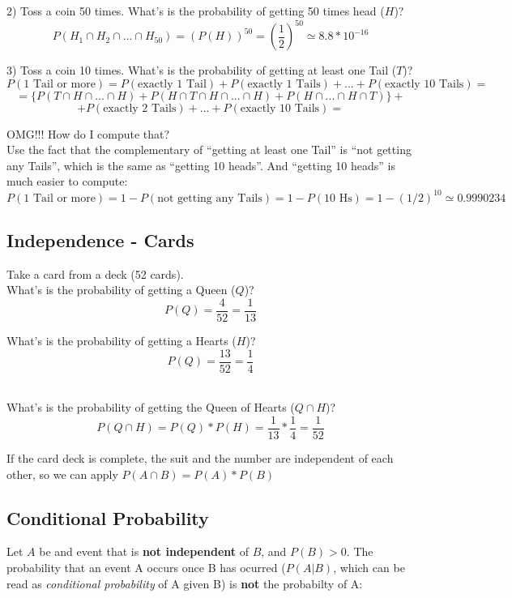 \documentclass[11pt]{article}
\begin{document}
	2) Toss a coin 50 times. What's is the probability of getting 50 times head ($H$)?
	\[P(H_1\cap H_2 \cap...\cap H_{50}) = (P(H))^{50} = \left(\frac{1}{2}\right)^{50} \simeq 8.8 * 10^{-16}\]
	
	3) Toss a coin 10 times. What's is the probability of  getting at least one Tail ($T$)?
	\[P(\text{1 Tail or more}) = P(\text{exactly 1 Tail}) + P(\text{exactly 1 Tails}) + ... + P(\text{exactly 10 Tails}) =\]
	\[= \{P(T\cap H \cap ... \cap H) + P(H \cap T\cap H \cap ... \cap H) + P(H \cap ... \cap H \cap T)\} +  \]
	\[+P(\text{exactly 2 Tails}) + ... + P(\text{exactly 10 Tails}) =\]

	OMG!!! How do I compute that?\\

	Use the fact that the complementary of ``getting at least one Tail'' is ``not getting any Tails'', which is the same as ``getting 10 heads''. And ``getting 10 heads'' is much easier to compute:
	\[P(\text{1 Tail or more}) = 1 - P(\text{not getting any Tails}) = 1 - P(\text{10 Hs}) = 1 - (1/2)^{10}  \simeq 0.9990234\]


	\subsection*{Independence - Cards}
	
	Take a card from a deck (52 cards).\\
	
	What's is the probability of getting a Queen ($Q$)?
	\[P(Q) = \frac{4}{52} = \frac{1}{13}\]
	
	What's is the probability of getting a Hearts ($H$)?
	\[P(Q) = \frac{13}{52} = \frac{1}{4}\]\
	
	
	What's is the probability of getting the Queen of Hearts ($Q \cap H$)?
	\[P(Q \cap H) = P(Q) * P(H) = \frac{1}{13} * \frac{1}{4} = \frac{1}{52}\]

	If the card deck is complete, the suit and the number are independent of each other, so we can apply $P(A \cap B) = P(A) * P(B)$

	\subsection*{Conditional Probability}
	
	Let $A$ be and event that is \textbf{not independent} of $B$, and $P(B)>0$. The probability that an event A occurs once B has ocurred ($P(A|B)$, which can be read as \emph{conditional probability} of A given B) is \textbf{not} the probabilty of A:
	
\end{document}
